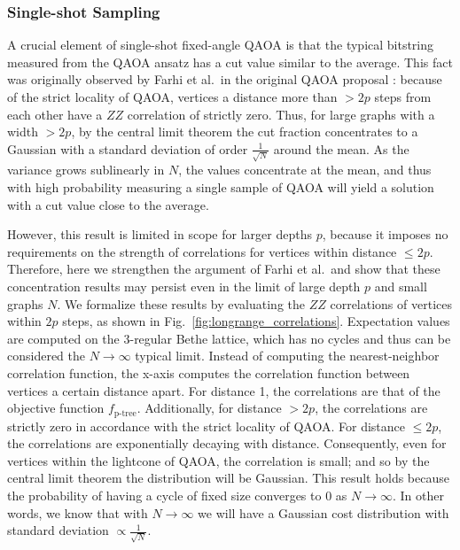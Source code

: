 \subsubsection{Single-shot Sampling}
\label{sec:single-shot}

A crucial element of single-shot fixed-angle QAOA is  that the typical bitstring measured from the QAOA ansatz has a cut value similar to the average. This fact was originally observed by Farhi et al.~in the original QAOA proposal \cite{farhi2014quantum}: because of the strict locality of QAOA, vertices a distance more than $>2p$ steps from each other have a $ZZ$ correlation of strictly zero. Thus, for large graphs with a width $>2p$, by the central limit theorem the cut fraction concentrates to a Gaussian with a standard deviation of order $\frac{1}{\sqrt{N}}$ around the mean. As the variance grows sublinearly in $N$, the values concentrate at the mean, and thus with high probability measuring a single sample of QAOA will yield a solution with a cut value close to the average.

However, this result is limited in scope for larger depths $p$, because it imposes no requirements on the strength of correlations for vertices within distance $\leq2p$. Therefore, here we strengthen the argument of Farhi et al.~and show that these concentration results may persist even in the limit of large depth $p$ and small graphs $N$. We formalize these results by evaluating the $ZZ$ correlations of vertices within $2p$ steps, as shown in Fig.~\ref{fig:longrange_correlations}. Expectation values are computed on the 3-regular Bethe lattice, which has no cycles and thus can be considered the $N\to\infty$ typical limit. Instead of computing the nearest-neighbor correlation function, the x-axis computes the correlation function between vertices a certain distance apart. For distance 1, the correlations are that of the objective function $f_\text{p-tree}$. Additionally, for  distance $>2p$, the correlations are strictly zero in accordance with the strict locality of QAOA. For distance $\leq 2p$, the correlations are exponentially decaying with distance. Consequently, even for vertices within the lightcone of QAOA, the correlation is small; and so by the central limit theorem the distribution will be Gaussian.
This result holds because the probability of having a cycle of fixed size converges to 0 as $N\to \infty$. 
In other words, we know that with $N\to\infty$ we will have a Gaussian cost distribution with standard deviation $\propto\frac{1}{\sqrt N}$.

